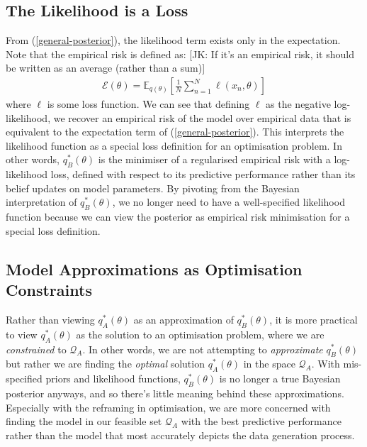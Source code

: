 \documentclass[twoside,11pt]{article}
\newcommand{\jk}[1]{{\color{blue} [JK: #1]}}
\begin{document}
\subsection{The Likelihood is a Loss}
From (\ref{general-posterior}), the likelihood term exists only in the expectation. Note that the empirical risk is defined as:
\jk{If it's an empirical risk, it should be written as an average (rather than a sum)}
\begin{align}
\mathcal{E}(\theta) = \mathbb{E}_{q(\theta)}\left[\frac{1}{N}\sum_{n=1}^N \ell\left(x_n, \theta\right)\right]
\label{empirical-risk}
\end{align}
where $\ell$ is some loss function. We can see that defining $\ell$ as the negative log-likelihood, we recover an empirical risk of the model over empirical data that is equivalent to the expectation term of (\ref{general-posterior}). This interprets the likelihood function as a special loss definition for an optimisation problem. In other words, $q_B^*(\theta)$ is the minimiser of a regularised empirical risk with a log-likelihood loss, defined with respect to its predictive performance rather than its belief updates on model parameters. By pivoting from the Bayesian interpretation of $q_B^*(\theta)$, we no longer need to have a well-specified likelihood function because we can view the posterior as empirical risk minimisation for a special loss definition.

\subsection{Model Approximations as Optimisation Constraints}
Rather than viewing $q_A^*(\theta)$ as an approximation of $q_B^*(\theta)$, it is more practical to view $q_A^*(\theta)$ as the solution to an optimisation problem, where we are \textit{constrained} to $\mathcal{Q}_{A}$. In other words, we are not attempting to \textit{approximate} $q_B^*(\theta)$ but rather we are finding the \textit{optimal} solution $q_A^*(\theta)$ in the space $\mathcal{Q}_{A}$. With mis-specified priors and likelihood functions, $q_B^*(\theta)$  is no longer a true Bayesian posterior anyways, and so there's little meaning behind these approximations. Especially with the reframing in optimisation, we are more concerned with finding the model in our feasible set $\mathcal{Q}_{A}$ with the best predictive performance rather than the model that most accurately depicts the data generation process.
\end{document}
